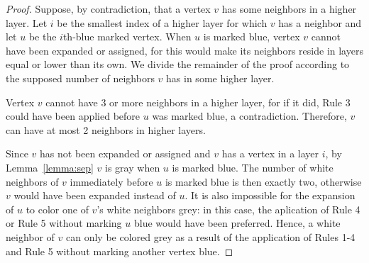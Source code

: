 \documentclass[12pt]{article}
\begin{document}
\begin{proof}
  Suppose, by contradiction, that a vertex $v$ has some neighbors in a higher layer.
  Let $i$ be the smallest index of a higher layer for which $v$ has a neighbor and let $u$ be the $i$th-blue marked vertex.
  When $u$ is marked blue, vertex $v$ cannot have been expanded or assigned, for this would make its neighbors reside in layers equal or lower than its own.
  We divide the remainder of the proof according to the supposed number of neighbors $v$ has in some higher layer.

  Vertex $v$ cannot have 3 or more neighbors in a higher layer, for if it did, Rule 3 could have been applied before $u$ was marked blue, a contradiction.
  Therefore, $v$ can have at most 2 neighbors in higher layers.

  Since $v$ has not been expanded or assigned and $v$ has a vertex in a layer $i$, by Lemma~\ref{lemma:sep} $v$ is gray when $u$ is marked blue.
  The number of white neighbors of $v$ immediately before $u$ is marked blue is then exactly two, otherwise $v$ would have been expanded instead of $u$.
  It is also impossible for the expansion of $u$ to color one of $v$'s white neighbors grey: in this case, the aplication of Rule 4 or Rule 5 without marking $u$ blue would have been preferred.
  Hence, a white neighbor of $v$ can only be colored grey as a result of the application of Rules 1-4 and Rule 5 without marking another vertex blue.

\end{proof}
\end{document}
